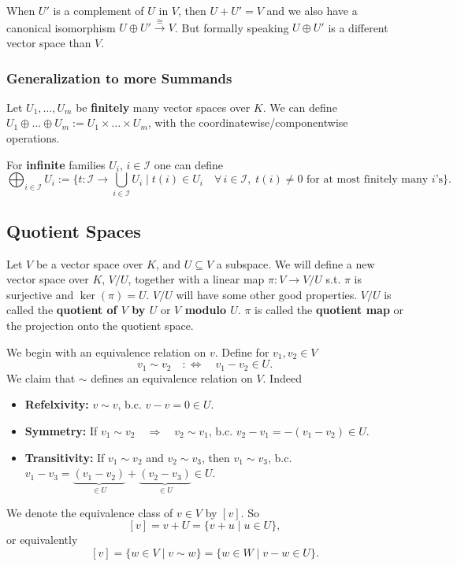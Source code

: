 \begin{remark}
	When $U'$ is a complement of $U$ in $V$, then $U+ U' = V$ and we also have a canonical isomorphism $U \oplus U' \overset{\cong}{\longrightarrow} V$. But formally speaking $U \oplus U'$ is a different vector space than $V$.
\end{remark}

\subsubsection{Generalization to more Summands}
Let $U_1, \hdots , U_m$ be \textbf{finitely} many vector spaces over $K$. We can define $U_1 \oplus \hdots \oplus U_m := U_1 \times \hdots \times U_m$, with the coordinatewise/componentwise operations.

For \textbf{infinite} families $U_i,\, i\in \mathcal{I}$ one can define
\[
	\bigoplus_{i \in \mathcal{I}} U_i := \biggl\{t:\mathcal{I} \to \bigcup_{i \in \mathcal{I}} U_i \;|\; t(i) \in U_i \quad \forall \, i \in \mathcal{I}, \; t(i) \neq 0 \text{ for at most finitely many $i$'s}\biggr\}.
\]

\subsection{Quotient Spaces}
Let $V$ be a vector space over $K$, and $U \subseteq V$ a subspace. We will define a new vector space over $K$, $V/U$, together with a linear map $\pi :V \to V/U$ s.t. $\pi$ is surjective and $\ker(\pi) = U$. $V/U$ will have some other good properties. $V/U$ is called the \textbf{quotient of $V$ by $U$} or \textbf{$V$ modulo $U$}. $\pi$ is called the \textbf{quotient map} or the projection onto the quotient space.

We begin with an equivalence relation on $v$. Define for $v_1, v_2 \in V$
\[
	v_1 \sim v_2 \quad :\Longleftrightarrow \quad v_1 - v_2 \in U.
\]
We claim that $\sim$ defines an equivalence relation on $V$. Indeed
\begin{itemize}
	\item[$\bullet$]\textbf{Refelxivity:} $v \sim v$, b.c. $v - v = 0 \in U$.
	\item[$\bullet$]\textbf{Symmetry:} If $v_1 \sim v_2 \quad \Longrightarrow \quad v_2 \sim v_1$, b.c. $v_2 - v_1 = -(v_1 - v_2) \in U$.
	\item[$\bullet$]\textbf{Transitivity:} If $v_1 \sim v_2$ and $v_2 \sim v_3$, then $v_1 \sim v_3$, b.c. $v_1 - v_3 = \underbrace{(v_1 - v_2)}_{\displaystyle \in U} + \underbrace{(v_2 - v_3)}_{\displaystyle \in U} \in U$.
\end{itemize}
We denote the equivalence class of $v \in V$ by $[v]$. So
\[
	[v] = v + U = \{v + u \; |\; u \in U\},
\]
or equivalently
\[
	[v] = \{w \in V \; |\; v \sim w\} = \{w \in W\; |\; v - w \in U\}.
\]

